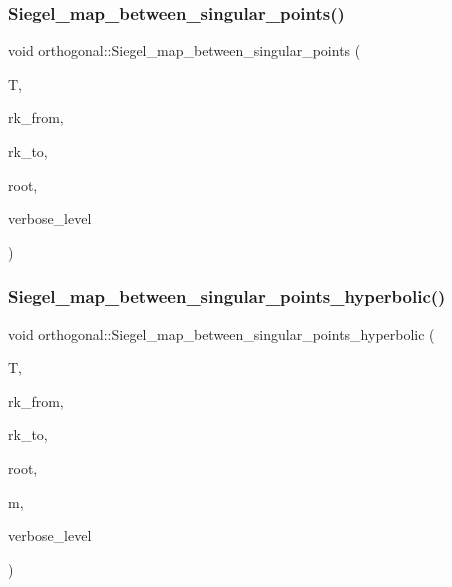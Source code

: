 \subsubsection{\texorpdfstring{Siegel\+\_\+map\+\_\+between\+\_\+singular\+\_\+points()}{Siegel\_map\_between\_singular\_points()}}
{\footnotesize\ttfamily void orthogonal\+::\+Siegel\+\_\+map\+\_\+between\+\_\+singular\+\_\+points (\begin{DoxyParamCaption}\item[{\mbox{\hyperlink{galois_8h_a09fddde158a3a20bd2dcadb609de11dc}{I\+NT}} $\ast$}]{T,  }\item[{\mbox{\hyperlink{galois_8h_a09fddde158a3a20bd2dcadb609de11dc}{I\+NT}}}]{rk\+\_\+from,  }\item[{\mbox{\hyperlink{galois_8h_a09fddde158a3a20bd2dcadb609de11dc}{I\+NT}}}]{rk\+\_\+to,  }\item[{\mbox{\hyperlink{galois_8h_a09fddde158a3a20bd2dcadb609de11dc}{I\+NT}}}]{root,  }\item[{\mbox{\hyperlink{galois_8h_a09fddde158a3a20bd2dcadb609de11dc}{I\+NT}}}]{verbose\+\_\+level }\end{DoxyParamCaption})}

\mbox{\label{classorthogonal_a5ee80bd3a8fb9799d248ade8fd7b20b3}} 
\subsubsection{\texorpdfstring{Siegel\+\_\+map\+\_\+between\+\_\+singular\+\_\+points\+\_\+hyperbolic()}{Siegel\_map\_between\_singular\_points\_hyperbolic()}}
{\footnotesize\ttfamily void orthogonal\+::\+Siegel\+\_\+map\+\_\+between\+\_\+singular\+\_\+points\+\_\+hyperbolic (\begin{DoxyParamCaption}\item[{\mbox{\hyperlink{galois_8h_a09fddde158a3a20bd2dcadb609de11dc}{I\+NT}} $\ast$}]{T,  }\item[{\mbox{\hyperlink{galois_8h_a09fddde158a3a20bd2dcadb609de11dc}{I\+NT}}}]{rk\+\_\+from,  }\item[{\mbox{\hyperlink{galois_8h_a09fddde158a3a20bd2dcadb609de11dc}{I\+NT}}}]{rk\+\_\+to,  }\item[{\mbox{\hyperlink{galois_8h_a09fddde158a3a20bd2dcadb609de11dc}{I\+NT}}}]{root,  }\item[{\mbox{\hyperlink{galois_8h_a09fddde158a3a20bd2dcadb609de11dc}{I\+NT}}}]{m,  }\item[{\mbox{\hyperlink{galois_8h_a09fddde158a3a20bd2dcadb609de11dc}{I\+NT}}}]{verbose\+\_\+level }\end{DoxyParamCaption})}


